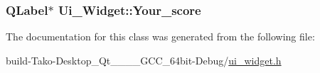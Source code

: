 \subsubsection[{\texorpdfstring{Your\+\_\+score}{Your_score}}]{\setlength{\rightskip}{0pt plus 5cm}Q\+Label$\ast$ Ui\+\_\+\+Widget\+::\+Your\+\_\+score}\hypertarget{classUi__Widget_a7388813576eee42f6a610dd8547d4ccb}{}\label{classUi__Widget_a7388813576eee42f6a610dd8547d4ccb}


The documentation for this class was generated from the following file\+:\begin{DoxyCompactItemize}
\item 
build-\/\+Tako-\/\+Desktop\+\_\+\+Qt\+\_\+\_\+\_\+\_\+\+G\+C\+C\+\_\+64bit-\/\+Debug/\hyperlink{ui__widget_8h}{ui\+\_\+widget.\+h}\end{DoxyCompactItemize}
